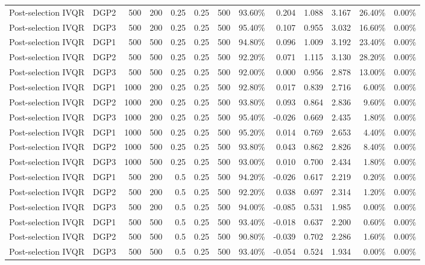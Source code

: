 \begin{landscape}
\begin{longtable}{llrrrrrrrrrrr}
Post-selection IVQR & DGP2 & 500 & 200 & 0.25 & 0.25 & 500 & 93.60\% & 0.204 & 1.088 & 3.167 & 26.40\% & 0.00\% \\
Post-selection IVQR & DGP3 & 500 & 200 & 0.25 & 0.25 & 500 & 95.40\% & 0.107 & 0.955 & 3.032 & 16.60\% & 0.00\% \\
Post-selection IVQR & DGP1 & 500 & 500 & 0.25 & 0.25 & 500 & 94.80\% & 0.096 & 1.009 & 3.192 & 23.40\% & 0.00\% \\
Post-selection IVQR & DGP2 & 500 & 500 & 0.25 & 0.25 & 500 & 92.20\% & 0.071 & 1.115 & 3.130 & 28.20\% & 0.00\% \\
Post-selection IVQR & DGP3 & 500 & 500 & 0.25 & 0.25 & 500 & 92.00\% & 0.000 & 0.956 & 2.878 & 13.00\% & 0.00\% \\
Post-selection IVQR & DGP1 & 1000 & 200 & 0.25 & 0.25 & 500 & 92.80\% & 0.017 & 0.839 & 2.716 & 6.00\% & 0.00\% \\
Post-selection IVQR & DGP2 & 1000 & 200 & 0.25 & 0.25 & 500 & 93.80\% & 0.093 & 0.864 & 2.836 & 9.60\% & 0.00\% \\
Post-selection IVQR & DGP3 & 1000 & 200 & 0.25 & 0.25 & 500 & 95.40\% & -0.026 & 0.669 & 2.435 & 1.80\% & 0.00\% \\
Post-selection IVQR & DGP1 & 1000 & 500 & 0.25 & 0.25 & 500 & 95.20\% & 0.014 & 0.769 & 2.653 & 4.40\% & 0.00\% \\
Post-selection IVQR & DGP2 & 1000 & 500 & 0.25 & 0.25 & 500 & 93.80\% & 0.043 & 0.862 & 2.826 & 8.40\% & 0.00\% \\
Post-selection IVQR & DGP3 & 1000 & 500 & 0.25 & 0.25 & 500 & 93.00\% & 0.010 & 0.700 & 2.434 & 1.80\% & 0.00\% \\
Post-selection IVQR & DGP1 & 500 & 200 & 0.5 & 0.25 & 500 & 94.20\% & -0.026 & 0.617 & 2.219 & 0.20\% & 0.00\% \\
Post-selection IVQR & DGP2 & 500 & 200 & 0.5 & 0.25 & 500 & 92.20\% & 0.038 & 0.697 & 2.314 & 1.20\% & 0.00\% \\
Post-selection IVQR & DGP3 & 500 & 200 & 0.5 & 0.25 & 500 & 94.00\% & -0.085 & 0.531 & 1.985 & 0.00\% & 0.00\% \\
Post-selection IVQR & DGP1 & 500 & 500 & 0.5 & 0.25 & 500 & 93.40\% & -0.018 & 0.637 & 2.200 & 0.60\% & 0.00\% \\
Post-selection IVQR & DGP2 & 500 & 500 & 0.5 & 0.25 & 500 & 90.80\% & -0.039 & 0.702 & 2.286 & 1.60\% & 0.00\% \\
Post-selection IVQR & DGP3 & 500 & 500 & 0.5 & 0.25 & 500 & 93.40\% & -0.054 & 0.524 & 1.934 & 0.00\% & 0.00\% \\

\end{longtable}
\end{landscape}
